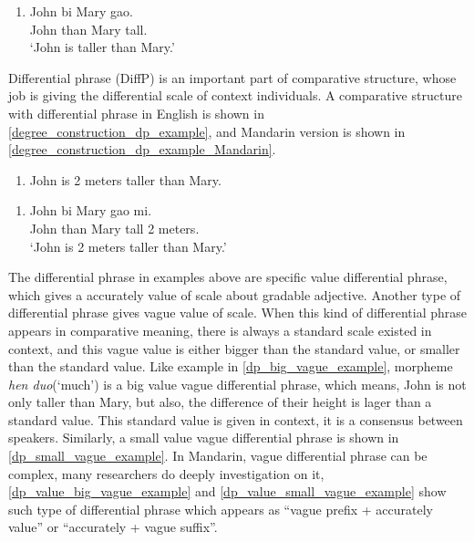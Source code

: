 \documentclass{ctexart}
\let \cite \parencite
\begin{document}
\begin{enumerate}
    \item \label{degree_construction_example_Mandarin}
    John \enspace bi \enspace Mary \enspace gao.  \\
    John than Mary \enspace tall. \\
    `John is taller than Mary.'
\end{enumerate}

Differential phrase (DiffP) is an important part of comparative structure, whose job is giving the differential scale of context individuals. A comparative structure with differential phrase in English is shown in \ref{degree_construction_dp_example}, and Mandarin version is shown in \ref{degree_construction_dp_example_Mandarin}.

\begin{enumerate}
    \item \label{degree_construction_dp_example}
    John is 2 meters taller than Mary.
\end{enumerate}

\begin{enumerate}
    \item \label{degree_construction_dp_example_Mandarin}
    John \enspace bi \enspace Mary \enspace gao  mi.  \\
    John than Mary \enspace tall 2 meters. \\
    `John is 2 meters taller than Mary.'
\end{enumerate}

The differential phrase in examples above are specific value differential phrase, which gives a accurately value of scale about gradable adjective. Another type of differential phrase gives vague value of scale. When this kind of differential phrase appears in comparative meaning, there is always a standard scale existed in context, and this vague value is either bigger than the standard value, or smaller than the standard value. Like example in \ref{dp_big_vague_example}, morpheme \textit{hen duo}(`much') is a big value vague differential phrase, which means, John is not only taller than Mary, but also, the difference of their height is lager than a standard value. This standard value is given in context, it is a consensus between speakers. Similarly, a small value vague differential phrase is shown in \ref{dp_small_vague_example}. In Mandarin, vague differential phrase can be complex, many researchers \cite{lin2014,li2015} do deeply investigation on it, \ref{dp_value_big_vague_example} and \ref{dp_value_small_vague_example} show such type of differential phrase which appears as ``vague prefix + accurately value'' or ``accurately + vague suffix''.
\end{document}
